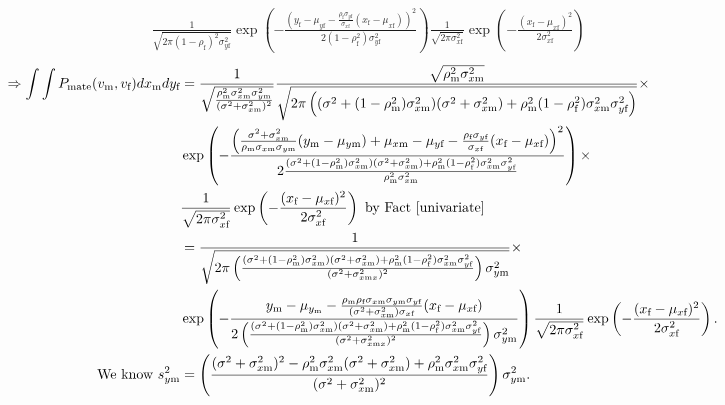 \documentclass{article}
\newcommand{\x}[1]{\text{#1}}
\begin{document}
\begin{pf}
\begin{enumerate}
\begin{align*}
\\&\frac{1}{\sqrt{2\pi(1-\rho_\x{f})^2\sigma_{y\x{f}}^2}}\exp\left(-\frac{\left(y_\x{f}-\mu_{y\x{f}}-\frac{\rho_\x{f}\sigma_{y\x{f}}}{\sigma_{x\x{f}}}(x_\x{f}-\mu_{x\x{f}})\right)^2}{2(1-\rho_\x{f}^2)\sigma_{y\x{f}}^2}\right)\frac{1}{\sqrt{2\pi\sigma_{x\x{f}}^2}}\exp\left(-\frac{(x_\x{f}-\mu_{x\x{f}})^2}{2\sigma_{x\x{f}}^2}\right)
\end{align*}
\begin{align*}
\Rightarrow \int\int P_\text{mate}(v_\x{m},v_\x{f})dx_\x{m}dy_\x{f}&=\frac{1}{\sqrt{\frac{\rho_\x{m}^2\sigma_{x\x{m}}^2\sigma_{y\x{m}}^2}{(\sigma^2+\sigma_{x\x{m}}^2)^2}}}\frac{\sqrt{\rho_\x{m}^2\sigma_{x\x{m}}^2}}{\sqrt{2\pi\left((\sigma^2+(1-\rho_\x{m}^2)\sigma_{x\x{m}}^2)(\sigma^2+\sigma_{x\x{m}}^2)+\rho_\x{m}^2(1-\rho_\x{f}^2)\sigma_{x\x{m}}^2\sigma_{y\x{f}}^2\right)}}\times
\\&\exp\left(-\frac{\left(\frac{\sigma^2+\sigma_{x\x{m}}^2}{\rho_\x{m}\sigma_{x\x{m}}\sigma_{y\x{m}}}(y_\x{m}-\mu_{y\x{m}})+\mu_{x\x{m}}-\mu_{y\x{f}}-\frac{\rho_\x{f}\sigma_{y\x{f}}}{\sigma_{x\x{f}}}(x_\x{f}-\mu_{x\x{f}})\right)^2}{2\frac{(\sigma^2+(1-\rho_\x{m}^2)\sigma_{x\x{m}}^2)(\sigma^2+\sigma_{x\x{m}}^2)+\rho_\x{m}^2(1-\rho_\x{f}^2)\sigma_{x\x{m}}^2\sigma_{y\x{f}}^2}{\rho_{\x{m}}^2\sigma_{x\x{m}}^2}}\right)\times
\\&\frac{1}{\sqrt{2\pi\sigma_{x\x{f}}^2}}\exp\left(-\frac{(x_\x{f}-\mu_{x\x{f}})^2}{2\sigma_{x\x{f}}^2}\right) \text{ by Fact \ref{univariate}}
\\&=\frac{1}{\sqrt{2\pi\left(\frac{(\sigma^2+(1-\rho_\x{m}^2)\sigma_{x\x{m}}^2)(\sigma^2+\sigma_{x\x{m}}^2)+\rho_\x{m}^2(1-\rho_\x{f}^2)\sigma_{x\x{m}}^2\sigma_{y\x{f}}^2}{(\sigma^2+\sigma_{x\x{m}x}^2)^2}\right)\sigma_{y\x{m}}^2}}\times
\\&\exp\left(-\frac{y_\x{m}-\mu_{y_\x{m}}-\frac{\rho_\x{m}\rho_\x{f}\sigma_{x\x{m}}\sigma_{y\x{m}}\sigma_{y\x{f}}}{(\sigma^2+\sigma_{x\x{m}}^2)\sigma_{x\x{f}}}(x_\x{f}-\mu_{x\x{f}})}{2\left(\frac{(\sigma^2+(1-\rho_\x{m}^2)\sigma_{x\x{m}}^2)(\sigma^2+\sigma_{x\x{m}}^2)+\rho_\x{m}^2(1-\rho_\x{f}^2)\sigma_{x\x{m}}^2\sigma_{y\x{f}}^2}{(\sigma^2+\sigma_{x\x{m}x}^2)^2}\right)\sigma_{y\x{m}}^2}\right)\frac{1}{\sqrt{2\pi\sigma_{x\x{f}}^2}}\exp\left(-\frac{(x_\x{f}-\mu_{x\x{f}})^2}{2\sigma_{x\x{f}}^2}\right).
\\\text{ We know } s_{y\x{m}}^2&=\left(\frac{(\sigma^2+\sigma_{x\x{m}}^2)^2-\rho_\x{m}^2\sigma_{x\x{m}}^2(\sigma^2+\sigma_{x\x{m}}^2)+\rho_\x{m}^2\sigma_{x\x{m}}^2\sigma_{y\x{f}}^2}{(\sigma^2+\sigma_{x\x{m}}^2)^2}\right)\sigma_{y\x{m}}^2.

\end{align*}
\end{enumerate}
\end{pf}
\end{document}
